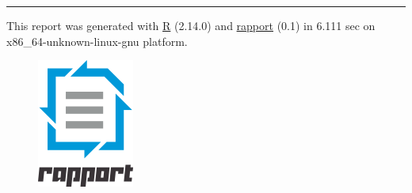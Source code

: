 \documentclass[]{article}
\makeatletter
\def\maxwidth{\ifdim\Gin@nat@width>\linewidth\linewidth
\else\Gin@nat@width\fi}
\let\Oldincludegraphics\includegraphics
\renewcommand{\includegraphics}[1]{\Oldincludegraphics[width=\maxwidth]{#1}}
\makeatother
\begin{document}
\begin{center}\rule{3in}{0.4pt}\end{center}

This report was generated with \href{http://www.r-project.org/}{R}
(2.14.0) and \href{http://al3xa.github.com/rapport/}{rapport} (0.1) in
6.111 sec on x86\_64-unknown-linux-gnu platform.

\begin{figure}[htbp]
\centering
\includegraphics{images/logo.png}
\caption{}
\end{figure}
\end{document}
